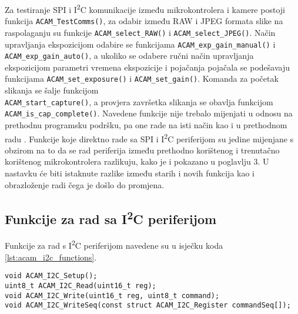 \noindent Za testiranje SPI i I\textsuperscript{2}C komunikacije između mikrokontrolera i kamere postoji funkcija \verb|ACAM_TestComms()|, za odabir između RAW i JPEG formata slike na raspolaganju su funkcije \verb|ACAM_select_RAW()| i \verb|ACAM_select_JPEG()|. Način upravljanja ekspozicijom odabire se funkcijama \verb|ACAM_exp_gain_manual()| i \\ \verb|ACAM_exp_gain_auto()|, a ukoliko se odabere ručni način upravljanja ekspozicijom parametri vremena ekspozicije i pojačanja pojačala se podešavaju funkcijama \verb|ACAM_set_exposure()| i \verb|ACAM_set_gain()|. Komanda za početak slikanja se šalje funkcijom \\ \verb|ACAM_start_capture()|, a provjera završetka slikanja se obavlja funkcijom \\ \verb|ACAM_is_cap_complete()|. Navedene funkcije nije trebalo mijenjati u odnosu na prethodnu programsku podršku, pa one rade na isti način kao i u prethodnom radu \cite{diplomski_goran_petrak}. Funkcije koje direktno rade sa SPI i I\textsuperscript{2}C periferijom su jedine mijenjane s obzirom na to da se rad periferija između prethodno korištenog i trenutačno korištenog mikrokontrolera razlikuju, kako je i pokazano u poglavlju 3. U nastavku će biti istaknute razlike između starih i novih funkcija kao i obrazloženje radi čega je došlo do promjena.

\subsection{Funkcije za rad sa I\textsuperscript{2}C periferijom}

Funkcije za rad s I\textsuperscript{2}C periferijom navedene su u isječku koda \ref{lst:acam_i2c_functions}.

\begin{lstlisting}[caption=Funkcije za rad s I\textsuperscript{2}C periferijom, label={lst:acam_i2c_functions}]
void ACAM_I2C_Setup();
uint8_t ACAM_I2C_Read(uint16_t reg);
void ACAM_I2C_Write(uint16_t reg, uint8_t command);
void ACAM_I2C_WriteSeq(const struct ACAM_I2C_Register commandSeq[]);
\end{lstlisting}

